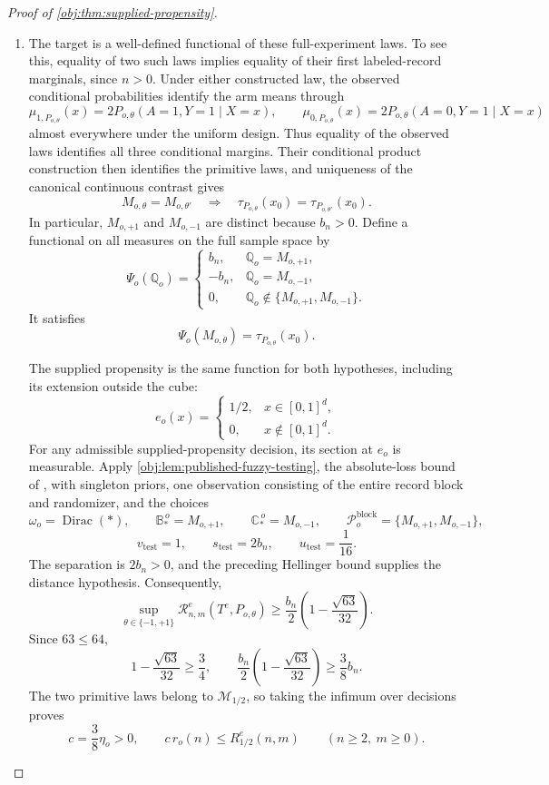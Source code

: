 \begin{proof}[Proof of \cref{obj:thm:supplied-propensity}]
\begin{enumerate}
\item The target is a well-defined functional of these full-experiment laws. To see this, equality of two such laws implies equality of their first labeled-record marginals, since \(n>0\). Under either constructed law, the observed conditional probabilities identify the arm means through
\[
\mu_{1,P_{o,\theta}}(x)
=
2P_{o,\theta}(A=1,Y=1\mid X=x),
\qquad
\mu_{0,P_{o,\theta}}(x)
=
2P_{o,\theta}(A=0,Y=1\mid X=x)
\]
almost everywhere under the uniform design. Thus equality of the observed laws identifies all three conditional margins. Their conditional product construction then identifies the primitive laws, and uniqueness of the canonical continuous contrast gives
\[
M_{o,\theta}=M_{o,\theta'}
\quad\Longrightarrow\quad
\tau_{P_{o,\theta}}(x_0)=\tau_{P_{o,\theta'}}(x_0).
\]
In particular, \(M_{o,+1}\) and \(M_{o,-1}\) are distinct because \(b_n>0\). Define a functional on all measures on the full sample space by
\[
\Psi_o(\mathbb Q_o)=
\begin{cases}
b_n,&\mathbb Q_o=M_{o,+1},\\
-b_n,&\mathbb Q_o=M_{o,-1},\\
0,&\mathbb Q_o\notin\{M_{o,+1},M_{o,-1}\}.
\end{cases}
\]
It satisfies
\[
\Psi_o(M_{o,\theta})=\tau_{P_{o,\theta}}(x_0).
\]

The supplied propensity is the same function for both hypotheses, including its extension outside the cube:
\[
e_o(x)=
\begin{cases}
1/2,&x\in[0,1]^d,\\
0,&x\notin[0,1]^d.
\end{cases}
\]
For any admissible supplied-propensity decision, its section at \(e_o\) is measurable. Apply \cref{obj:lem:published-fuzzy-testing}, the absolute-loss bound of
\citep[Section 3, Lemma 1]{KennedyBalakrishnanRobinsWasserman2024},
with singleton priors, one observation consisting of the entire record block and randomizer, and the choices
\[
\omega_o=\operatorname{Dirac}(*),
\qquad
\mathbb B_*^{\,o}=M_{o,+1},
\qquad
\mathbb C_*^{\,o}=M_{o,-1},
\qquad
\mathcal P_o^{\mathrm{block}}=\{M_{o,+1},M_{o,-1}\},
\]
\[
v_{\mathrm{test}}=1,
\qquad
s_{\mathrm{test}}=2b_n,
\qquad
u_{\mathrm{test}}=\frac1{16}.
\]
The separation is \(2b_n>0\), and the preceding Hellinger bound supplies the distance hypothesis. Consequently,
\[
\sup_{\theta\in\{-1,+1\}}
\mathcal R^e_{n,m}(T^e,P_{o,\theta})
\ge
\frac{b_n}{2}
\left(1-\frac{\sqrt{63}}{32}\right).
\]
Since \(63\le64\),
\[
1-\frac{\sqrt{63}}{32}\ge\frac34,
\qquad
\frac{b_n}{2}
\left(1-\frac{\sqrt{63}}{32}\right)\ge\frac38b_n.
\]
The two primitive laws belong to \(\mathcal M_{1/2}\), so taking the infimum over decisions proves
\[
c=\frac38\eta_o>0,
\qquad
c\,r_o(n)\le R^e_{1/2}(n,m)
\qquad(n\ge2,\ m\ge0).
\]


\end{enumerate}
\end{proof}

